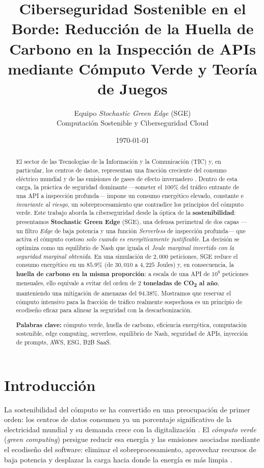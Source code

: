 \documentclass[10pt,twocolumn]{article}
\title{\vspace{-1.2em}\textbf{Ciberseguridad Sostenible en el Borde: Reducci\'on de la
Huella de Carbono en la Inspecci\'on de APIs mediante C\'omputo Verde y Teor\'ia de
Juegos}}
\author{Equipo \emph{Stochastic Green Edge} (SGE)\\
\small Computaci\'on Sostenible y Ciberseguridad Cloud}
\date{\today}
\begin{document}
\maketitle

\begin{abstract}
\noindent El sector de las Tecnolog\'ias de la Informaci\'on y la Comunicaci\'on
(TIC) y, en particular, los centros de datos, representan una fracci\'on creciente del
consumo el\'ectrico mundial y de las emisiones de gases de efecto invernadero
\cite{masanet,radu}. Dentro de esta carga, la pr\'actica de seguridad dominante
---someter el $100\%$ del tr\'afico entrante de una API a inspecci\'on profunda---
impone un consumo energ\'etico elevado, constante e \emph{invariante al riesgo},
un sobreprocesamiento que contradice los principios del c\'omputo verde. Este trabajo
aborda la ciberseguridad desde la \'optica de la \textbf{sostenibilidad}: presentamos
\textbf{Stochastic Green Edge} (SGE), una defensa perimetral de dos capas ---un filtro
\emph{Edge} de baja potencia y una funci\'on \emph{Serverless} de inspecci\'on
profunda--- que activa el c\'omputo costoso \emph{solo cuando es energ\'eticamente
justificable}. La decisi\'on se optimiza como un equilibrio de Nash que iguala el
\emph{Joule marginal invertido con la seguridad marginal obtenida}. En una simulaci\'on
de $2{,}000$ peticiones, SGE reduce el consumo energ\'etico en un \textbf{$85.9\%$}
(de $30{,}010$ a $4{,}225$ Joules) y, en consecuencia, la \textbf{huella de carbono en
la misma proporci\'on}: a escala de una API de $10^{9}$ peticiones mensuales, ello
equivale a evitar del orden de \textbf{$2$ toneladas de CO\textsubscript{2} al a\~no},
manteniendo una mitigaci\'on de amenazas del $94.38\%$. Mostramos que reservar el
c\'omputo intensivo para la fracci\'on de tr\'afico realmente sospechosa es un
principio de ecodise\~no eficaz para alinear la seguridad con la descarbonizaci\'on.

\vspace{4pt}
\noindent\textbf{Palabras clave:} c\'omputo verde, huella de carbono, eficiencia
energ\'etica, computaci\'on sostenible, edge computing, serverless, equilibrio de
Nash, seguridad de APIs, inyecci\'on de prompts, AWS, ESG, B2B SaaS.
\end{abstract}

\section{Introducci\'on}
La sostenibilidad del c\'omputo se ha convertido en una preocupaci\'on de primer orden:
los centros de datos consumen ya un porcentaje significativo de la electricidad
mundial y su demanda crece con la digitalizaci\'on \cite{masanet}. El
\emph{c\'omputo verde} (\emph{green computing}) persigue reducir esa energ\'ia y las
emisiones asociadas mediante el ecodise\~no del software: eliminar el
sobreprocesamiento, aprovechar recursos de baja potencia y desplazar la carga hacia
donde la energ\'ia es m\'as limpia \cite{radu,murugesan}.
\end{document}
